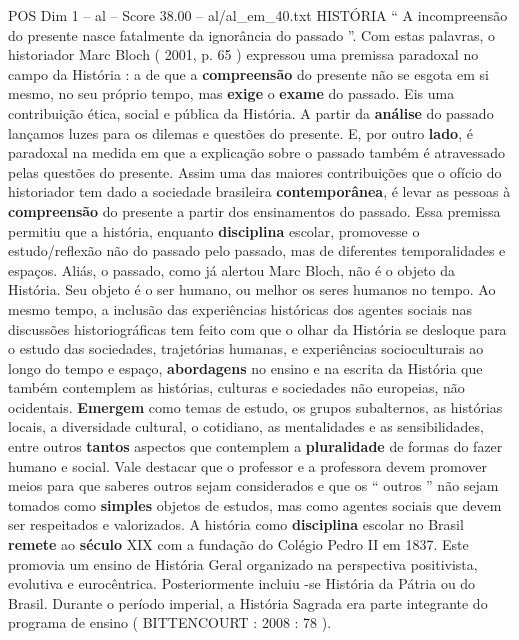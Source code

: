 \begin{textsample}{POS Dim 1 – al – Score 38.00 – al/al\_em\_40.txt}  \label{ex:f1_pos_159}
HISTÓRIA “ A incompreensão do presente nasce fatalmente da ignorância do passado ”.
Com estas palavras, o historiador Marc Bloch ( 2001, p. 65 ) expressou uma premissa paradoxal no campo da História : a de que a \textbf{compreensão} do presente não se esgota em si mesmo, no seu próprio tempo, mas \textbf{exige} o \textbf{exame} do passado.
Eis uma contribuição ética, social e pública da História.
A partir da \textbf{análise} do passado lançamos luzes para os dilemas e questões do presente.
E, por outro \textbf{lado}, é paradoxal na medida em que a explicação sobre o passado também é atravessado pelas questões do presente.
Assim uma das maiores contribuições que o ofício do historiador tem dado a sociedade brasileira \textbf{contemporânea}, é levar as pessoas à \textbf{compreensão} do presente a partir dos ensinamentos do passado.
Essa premissa permitiu que a história, enquanto \textbf{disciplina} escolar, promovesse o estudo/reflexão não do passado pelo passado, mas de diferentes temporalidades e espaços.
Aliás, o passado, como já alertou Marc Bloch, não é o objeto da História.
Seu objeto é o ser humano, ou melhor os seres humanos no tempo.
Ao mesmo tempo, a inclusão das experiências históricas dos agentes sociais nas discussões historiográficas tem feito com que o olhar da História se desloque para o estudo das sociedades, trajetórias humanas, e experiências socioculturais ao longo do tempo e espaço, \textbf{abordagens} no ensino e na escrita da História que também contemplem as histórias, culturas e sociedades não europeias, não ocidentais. \textbf{Emergem} como temas de estudo, os grupos subalternos, as histórias locais, a diversidade cultural, o cotidiano, as mentalidades e as sensibilidades, entre outros \textbf{tantos} aspectos que contemplem a \textbf{pluralidade} de formas do fazer humano e social.
Vale destacar que o professor e a professora devem promover meios para que saberes outros sejam considerados e que os “ outros ” não sejam tomados como \textbf{simples} objetos de estudos, mas como agentes sociais que devem ser respeitados e valorizados.
A história como \textbf{disciplina} escolar no Brasil \textbf{remete} ao \textbf{século} XIX com a fundação do Colégio Pedro II em 1837.
Este promovia um ensino de História Geral organizado na perspectiva positivista, evolutiva e eurocêntrica.
Posteriormente incluiu -se História da Pátria ou do Brasil.
Durante o período imperial, a História Sagrada era parte integrante do programa de ensino ( BITTENCOURT : 2008 : 78 ).

\end{textsample}
